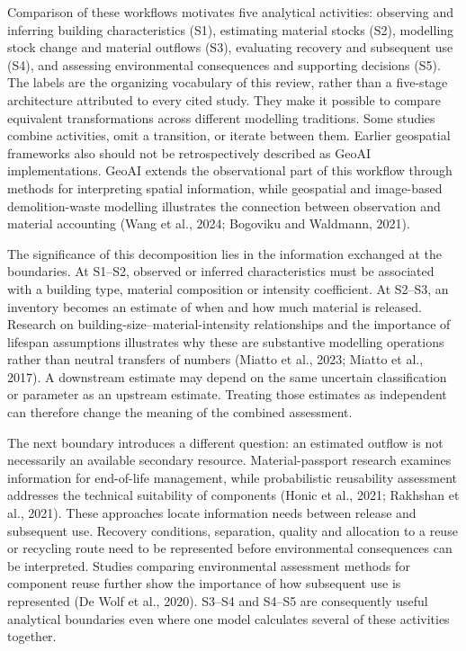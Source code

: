 Comparison of these workflows motivates five analytical activities: observing and inferring building characteristics (S1), estimating material stocks (S2), modelling stock change and material outflows (S3), evaluating recovery and subsequent use (S4), and assessing environmental consequences and supporting decisions (S5). The labels are the organizing vocabulary of this review, rather than a five-stage architecture attributed to every cited study. They make it possible to compare equivalent transformations across different modelling traditions. Some studies combine activities, omit a transition, or iterate between them. Earlier geospatial frameworks also should not be retrospectively described as GeoAI implementations. GeoAI extends the observational part of this workflow through methods for interpreting spatial information, while geospatial and image-based demolition-waste modelling illustrates the connection between observation and material accounting (Wang et al., 2024; Bogoviku and Waldmann, 2021).

The significance of this decomposition lies in the information exchanged at the boundaries. At S1–S2, observed or inferred characteristics must be associated with a building type, material composition or intensity coefficient. At S2–S3, an inventory becomes an estimate of when and how much material is released. Research on building-size–material-intensity relationships and the importance of lifespan assumptions illustrates why these are substantive modelling operations rather than neutral transfers of numbers (Miatto et al., 2023; Miatto et al., 2017). A downstream estimate may depend on the same uncertain classification or parameter as an upstream estimate. Treating those estimates as independent can therefore change the meaning of the combined assessment.

The next boundary introduces a different question: an estimated outflow is not necessarily an available secondary resource. Material-passport research examines information for end-of-life management, while probabilistic reusability assessment addresses the technical suitability of components (Honic et al., 2021; Rakhshan et al., 2021). These approaches locate information needs between release and subsequent use. Recovery conditions, separation, quality and allocation to a reuse or recycling route need to be represented before environmental consequences can be interpreted. Studies comparing environmental assessment methods for component reuse further show the importance of how subsequent use is represented (De Wolf et al., 2020). S3–S4 and S4–S5 are consequently useful analytical boundaries even where one model calculates several of these activities together.

